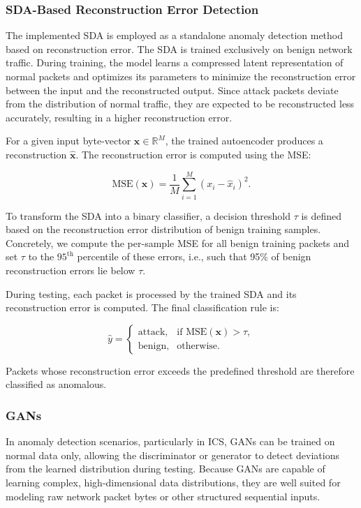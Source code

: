 \subsubsection{\ac{SDA}-Based Reconstruction Error Detection}

The implemented \ac{SDA}
is employed as a standalone anomaly detection method based on
reconstruction error. The \ac{SDA} is trained exclusively on benign network traffic. During training,
the model learns a compressed latent representation of normal packets and
optimizes its parameters to minimize the reconstruction error between the
input and the reconstructed output. Since attack packets deviate from the
distribution of normal traffic, they are expected to be reconstructed less
accurately, resulting in a higher reconstruction error.

For a given input byte-vector $\mathbf{x} \in \mathbb{R}^M$, the trained
autoencoder produces a reconstruction $\hat{\mathbf{x}}$. The reconstruction
error is computed using the \ac{MSE}:

\begin{equation}
\text{MSE}(\mathbf{x}) = \frac{1}{M} \sum_{i=1}^{M} (x_i - \hat{x}_i)^2.
\end{equation}

To transform the \ac{SDA} into a binary classifier, a decision threshold
$\tau$ is defined based on the reconstruction error distribution of
benign training samples. Concretely, we compute the per-sample \ac{MSE}
for all benign training packets and set $\tau$ to the
$95^{\text{th}}$ percentile of these errors, i.e., such that
95\% of benign reconstruction errors lie below $\tau$.

During testing, each packet is processed by the trained \ac{SDA} and its
reconstruction error is computed. The final classification rule is:

\begin{equation}
\hat{y} =
\begin{cases}
\text{attack}, & \text{if } \text{MSE}(\mathbf{x}) > \tau, \\
\text{benign}, & \text{otherwise}.
\end{cases}
\end{equation}

Packets whose reconstruction error exceeds the predefined threshold
are therefore classified as anomalous.


\subsubsection{\ac{GANs}}
In anomaly detection scenarios, particularly in \ac{ICS}, GANs can be trained on normal data only, allowing the discriminator or generator to detect deviations from the learned distribution during testing. Because GANs are capable of learning complex, high-dimensional data distributions, they are well suited for modeling raw network packet bytes or other structured sequential inputs. 




